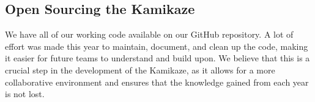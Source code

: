\subsection{Open Sourcing the Kamikaze}
We have all of our working code available on our GitHub repository. A lot of effort
was made this year to maintain, document, and clean up the code, making it easier
for future teams to understand and build upon. We believe that this is a crucial
step in the development of the Kamikaze, as it allows for a more collaborative
environment and ensures that the knowledge gained from each year is not lost. 

